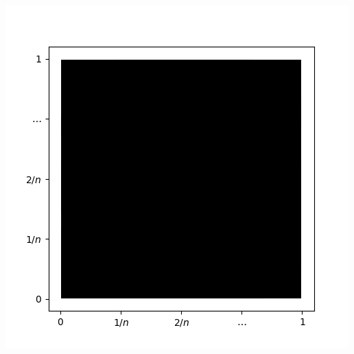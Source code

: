 \documentclass{beamer}
\begin{document}
\begin{frame}
{\begin{center}
				\includegraphics[scale=0.6]{imgs/perc_fig0.png}
			\end{center}
		}
\end{frame}
\end{document}
